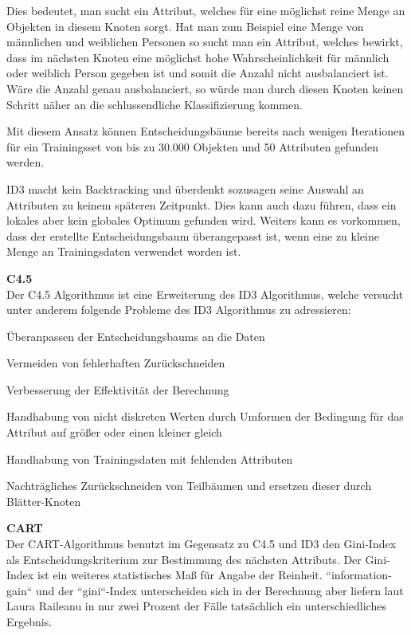 Dies bedeutet, man sucht ein Attribut, welches für eine möglichst reine Menge an Objekten in diesem Knoten sorgt. Hat man zum Beispiel eine Menge von männlichen und weiblichen Personen so sucht man ein Attribut, welches bewirkt, dass im nächsten Knoten eine möglichst hohe Wahrscheinlichkeit für männlich oder weiblich Person gegeben ist und somit die Anzahl nicht ausbalanciert ist. Wäre die Anzahl genau ausbalanciert, so würde man durch diesen Knoten keinen Schritt näher an die schlussendliche Klassifizierung kommen.

Mit diesem Ansatz können Entscheidungsbäume bereits nach wenigen Iterationen für ein Trainingsset von bis zu 30.000 Objekten und 50 Attributen gefunden werden. \cite{john_ross_quinlan_1986}

ID3 macht kein Backtracking und überdenkt sozusagen seine Auswahl an Attributen zu keinem späteren Zeitpunkt. Dies kann auch dazu führen, dass ein lokales aber kein globales Optimum gefunden wird. \cite{howard_hamilton_machine_2009} Weiters kann es vorkommen, dass der erstellte Entscheidungsbaum überangepasst ist, wenn eine zu kleine Menge an Trainingsdaten verwendet worden ist. \cite{rapidminer_rapidminer_2015}

\textbf{C4.5} \\
Der C4.5 Algorithmus ist eine Erweiterung des ID3 Algorithmus, welche versucht unter anderem folgende Probleme des ID3 Algorithmus zu adressieren:  \cite{howard_hamilton_machine_2009}

\begin{pitemize}
\item Überanpassen der Entscheidungsbaums an die Daten
\item Vermeiden von fehlerhaften Zurückschneiden
\item Verbesserung der Effektivität der Berechnung
\item Handhabung von nicht diskreten Werten durch Umformen der Bedingung für das Attribut auf  größer oder einen kleiner gleich
\item Handhabung von Trainingsdaten mit fehlenden Attributen
\item Nachträgliches Zurückschneiden von Teilbäumen und ersetzen dieser durch Blätter-Knoten
\end{pitemize}

\textbf{CART} \\
Der CART-Algorithmus benutzt im Gegensatz zu C4.5 und ID3 den Gini-Index als Entscheidungskriterium zur Bestimmung des nächsten Attributs. \cite{rapidminer_rapidminer_2015} Der Gini-Index ist ein weiteres statistisches Maß für Angabe der Reinheit. ``information-gain`` und der ``gini``-Index unterscheiden sich in der Berechnung aber liefern laut Laura Raileanu in nur zwei Prozent der Fälle tatsächlich ein unterschiedliches Ergebnis.  \cite{laura_raileanu_2004}

